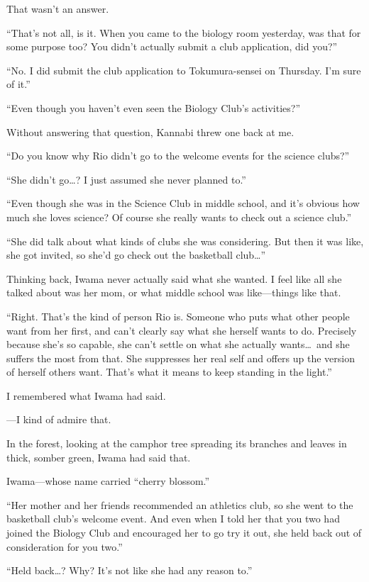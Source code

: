 \documentclass[
    a4paper,
    12pt,
    twoside,
    openany,
    UTF8,
    fontset=windows
]{ctexbook}
\begin{document}
That wasn't an answer.

``That's not all, is it. When you came to the biology room yesterday, was that for some purpose too? You didn't actually submit a club application, did you?''

``No. I did submit the club application to Tokumura-sensei on Thursday. I'm sure of it.''

``Even though you haven't even seen the Biology Club's activities?''

Without answering that question, Kannabi threw one back at me.

``Do you know why Rio didn't go to the welcome events for the science clubs?''

``She didn't go\dots? I just assumed she never planned to.''

``Even though she was in the Science Club in middle school, and it's obvious how much she loves science? Of course she really wants to check out a science club.''

``She did talk about what kinds of clubs she was considering. But then it was like, she got invited, so she'd go check out the basketball club\dots''

Thinking back, Iwama never actually said what she wanted. I feel like all she talked about was her mom, or what middle school was like---things like that.

``Right. That's the kind of person Rio is. Someone who puts what other people want from her first, and can't clearly say what she herself wants to do. Precisely because she's so capable, she can't settle on what she actually wants\dots\ and she suffers the most from that. She suppresses her real self and offers up the version of herself others want. That's what it means to keep standing in the light.''

I remembered what Iwama had said.

---I kind of admire that.

In the forest, looking at the camphor tree spreading its branches and leaves in thick, somber green, Iwama had said that.

Iwama---whose name carried ``cherry blossom.''

``Her mother and her friends recommended an athletics club, so she went to the basketball club's welcome event. And even when I told her that you two had joined the Biology Club and encouraged her to go try it out, she held back out of consideration for you two.''

``Held back\dots? Why? It's not like she had any reason to.''
\end{document}
